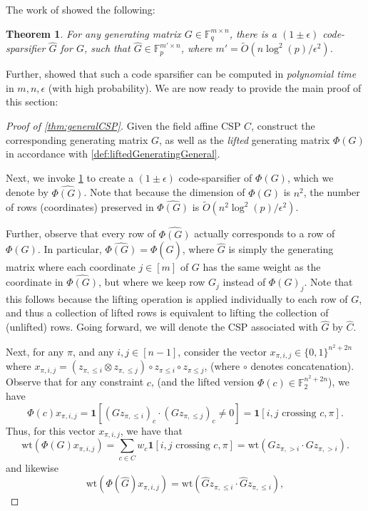 \documentclass[11pt]{article}
\newtheorem{theorem}{Theorem}[section]
\theoremstyle{definition}
\newcommand{\F}{\mathbb{F}}
\newcommand{\zo}{\{0, 1\}}
\newcommand{\eps}{\epsilon}
\newcommand{\wt}{\mathrm{wt}}
\begin{document}
The work of \cite{KPS24} showed the following:

\begin{theorem}\cite{KPS24}\label{thm:codeSparsificationGeneral}
	For any generating matrix $G \in \F_q^{m \times n}$, there is a $(1 \pm \eps)$ code-sparsifier $\hat{G}$ for $G$, such that $\hat{G} \in \F_p^{m' \times n}$, where $m' = \widetilde{O}(n \log^2(p)/ \eps^2)$.
\end{theorem}

Further, \cite{KPS24c} showed that such a code sparsifier can be computed in \emph{polynomial time} in $m, n, \eps$ (with high probability). We are now ready to provide the main proof of this section:

\begin{proof}[Proof of \cref{thm:generalCSP}]
Given the field affine CSP $C$, construct the corresponding generating matrix $G$, as well as the \emph{lifted} generating matrix $\Phi(G)$ in accordance with \cref{def:liftedGeneratingGeneral}. 
	
	Next, we invoke \cref{thm:codeSparsificationGeneral} to create a $(1 \pm \eps)$ code-sparsifier of $\Phi(G)$, which we denote by $\widehat{\Phi(G)}$. Note that because the dimension of $\Phi(G)$ is $n^2$, the number of rows (coordinates) preserved in $\widehat{\Phi(G)}$ is $\widetilde{O}(n^2  \log^2(p)/ \eps^2)$.
	
	Further, observe that every row of $\widehat{\Phi(G)}$ actually corresponds to a row of $\Phi(G)$. In particular, $\widehat{\Phi(G)} = \Phi(\widehat{G})$, where $\hat{G}$ is simply the generating matrix where each coordinate $j \in [m]$ of $G$ has the same weight as the coordinate in $\widehat{\Phi(G)}$, but where we keep row $G_j$ instead of $\Phi(G)_j$. Note that this follows because the lifting operation is applied individually to each row of $G$, and thus a collection of lifted rows is equivalent to lifting the collection of (unlifted) rows. Going forward, we will denote the CSP associated with $\hat{G}$ by $\hat{C}$.
	
	Next, for any $\pi$, and any $i, j \in [n-1]$, consider the vector $x_{\pi, i, j} \in \zo^{n^2 + 2n}$ where 
     $x_{\pi, i, j} = (z_{\pi, \leq i} \otimes z_{\pi, \leq j}) \circ z_{\pi \leq i} \circ z_{\pi \leq j}$, (where $\circ$ denotes concatenation). Observe that for any constraint $c$, (and the lifted version $\Phi(c) \in \F_2^{n^2 + 2n}$), we have
	\[
	\Phi(c) x_{\pi, i, j} = \mathbf{1}[(G z_{\pi, \leq i})_c \cdot  (G z_{\pi, \leq j})_c \neq 0] = \mathbf{1}[i,j \text{ crossing } c, \pi].
	\]
	Thus, for this vector $x_{\pi, i, j}$, we have that 
	\[
	\wt(\Phi(G) x_{\pi, i, j}) = \sum_{c \in C} w_c  \mathbf{1}[i,j \text{ crossing } c, \pi] =\wt(Gz_{\pi, > i} \cdot Gz_{\pi, > i}).
	\]
	and likewise
	\[
	\wt(\Phi(\widehat{G}) x_{\pi, i, j}) = \wt(\hat{G}z_{\pi, \leq i} \cdot \hat{G}z_{\pi, \leq i}),
	\]
	

\end{proof}
\end{document}
